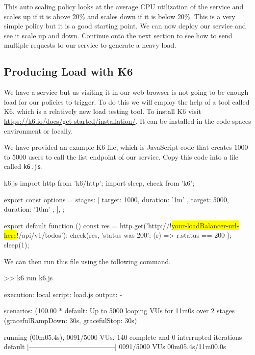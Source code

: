 \documentclass{csse4400}
\begin{document}
This auto scaling policy looks at the average CPU utilization of the service and scales up if it is above 20\% and scales down if it is below 20\%.
This is a very simple policy but it is a good starting point.
We can now deploy our service and see it scale up and down.
Continue onto the next section to see how to send multiple requests to our service to generate a heavy load.

\subsection{Producing Load with K6}\label{k6}

We have a service but us visiting it in our web browser is not going to be enough load for our policies to trigger.
To do this we will employ the help of a tool called K6,
which is a relatively new load testing tool.
To install K6 visit \url{https://k6.io/docs/get-started/installation/}.
It can be installed in the code spaces environment or locally.

We have provided an example K6 file, which is JavaScript code that creates
1000 to 5000 users to call the list endpoint of our service.
Copy this code into a file called \texttt{k6.js}.

\begin{code}[language=javascript,numbers=none,escapechar=!]{k6.js}
import http from 'k6/http';
import { sleep, check } from 'k6';

export const options = {
  stages: [
    { target: 1000, duration: '1m' },
    { target: 5000, duration: '10m' },
  ],
};

export default function () {
  const res = http.get('http://!\colorbox{yellow}{your-loadBalancer-url-here}!/api/v1/todos');
  check(res, { 'status was 200': (r) => r.status == 200 });
  sleep(1);
}
\end{code}

We can then run this file using the following command.

\begin{code}[language=bash,numbers=none,keepspaces=true]{}
>> k6 run k6.js
\end{code}

\begin{code}[language=bash,numbers=none,keepspaces=true]{}
execution: local
  script: load.js
  output: -

scenarios: (100.00%
        * default: Up to 5000 looping VUs for 11m0s over 2 stages (gracefulRampDown: 30s, gracefulStop: 30s)


running (00m05.4s), 0091/5000 VUs, 140 complete and 0 interrupted iterations
default   [--------------------------------------] 0091/5000 VUs  00m05.4s/11m00.0s

\end{code}
\end{document}
